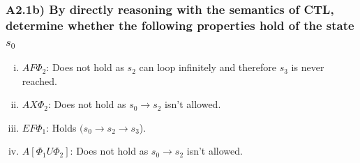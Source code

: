 \documentclass[12pt]{report}
\begin{document}
\subsubsection*{A2.1b) By directly reasoning with the semantics of CTL, determine whether the following properties hold of the state $s_0$}
\begin{enumerate}[i.]
	\item $AF \Phi_2$: Does not hold as $s_2$ can loop infinitely and therefore $s_3$ is never reached.
	\item $AX \Phi_2$: Does not hold as $s_0 \rightarrow s_2$ isn't allowed.
	\item $EF \Phi_1$: Holds $(s_0 \rightarrow s_2 \rightarrow s_3$).
	\item $A[\Phi_1 U \Phi_2]$: Does not hold as $s_0 \rightarrow s_2$ isn't allowed.
\end{enumerate}
\end{document}
